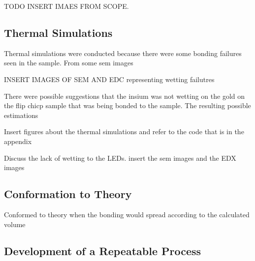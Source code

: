 TODO INSERT IMAES FROM SCOPE.


\subsection{Thermal Simulations}
Thermal simulations were conducted because there were some bonding failures seen in the sample.  From some sem images

INSERT IMAGES OF SEM AND EDC representing wetting failutres

There were possible suggestions that the insium was not wetting on the gold on the flip chicp sample that was being bonded to the sample. The resulting possible  estimations

Insert figures about the thermal simulations and refer to the code that is in the appendix

Discuss the lack of wetting to the LEDs. insert the sem images and the EDX images

\subsection{Conformation to Theory}
Conformed to theory when the bonding would spread according to the calculated volume

\subsection{Development of a Repeatable Process}
